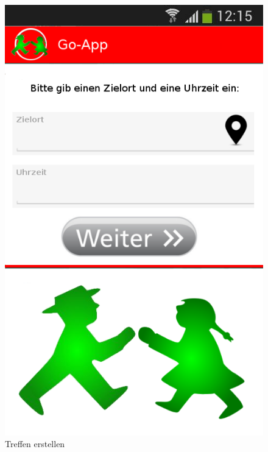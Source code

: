 \begin{figure}
	\caption{Treffen erstellen}
	\includegraphics[scale =0.5]{resources/images/treffpunkt_erstellen.png}
\end{figure}

